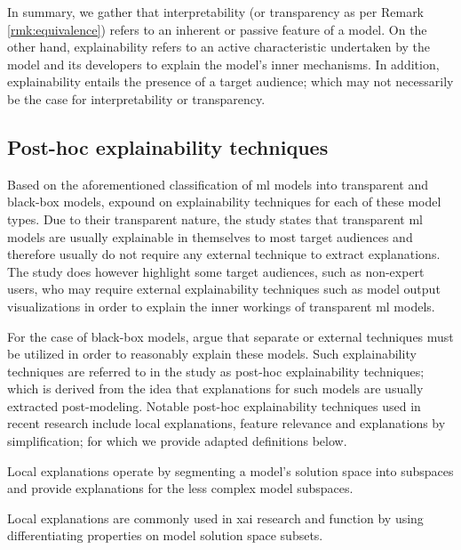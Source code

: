In summary, we gather that interpretability (or transparency as per Remark
\ref{rmk:equivalence}) refers to an inherent or passive feature of a model. On
the other hand, explainability refers to an active characteristic undertaken by
the model and its developers to explain the model's inner mechanisms. In
addition, explainability entails the presence of a target audience; which may
not necessarily be the case for interpretability or transparency.

\subsection{Post-hoc explainability techniques}

\label{section:xai_techniques}

Based on the aforementioned classification of \ac{ml} models into transparent and
black-box models, \citet{arrieta2020explainable} expound on explainability
techniques for each of these model types. Due to their transparent nature, the
study states that transparent \ac{ml} models are usually explainable in themselves to
most target audiences and therefore usually do not require any external
technique to extract explanations. The study does however highlight some target
audiences, such as non-expert users, who may require external explainability
techniques such as model output visualizations in order to explain the inner
workings of transparent \ac{ml} models.

For the case of black-box models, \citet{arrieta2020explainable} argue that
separate or external techniques must be utilized in order to reasonably explain
these models. Such explainability techniques are referred to in the study as
post-hoc explainability techniques; which is derived from the idea that
explanations for such models are usually extracted post-modeling. Notable
post-hoc explainability techniques used in recent research include local
explanations, feature relevance and explanations by simplification; for which we
provide adapted definitions below.

\begin{definition}
  Local explanations operate by segmenting a model's solution space into
  subspaces and provide explanations for the less complex model subspaces.
\end{definition}

\begin{remark}
  Local explanations are commonly used in \ac{xai} research and function by using
  differentiating properties on model solution space subsets.
\end{remark}

